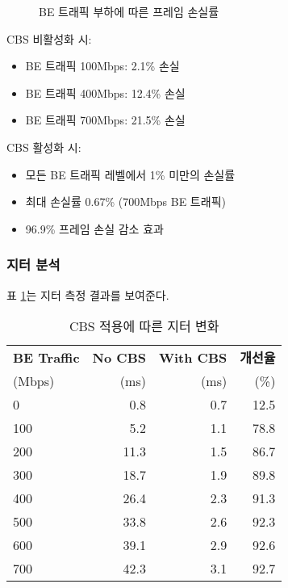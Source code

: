 \documentclass[twocolumn,10pt]{article}
\begin{document}
\begin{figure}[h]
\centering
{}
\caption{BE 트래픽 부하에 따른 프레임 손실률}
\label{fig:frame_loss}
\end{figure}

CBS 비활성화 시:
\begin{itemize}
    \item BE 트래픽 100Mbps: 2.1\% 손실
    \item BE 트래픽 400Mbps: 12.4\% 손실
    \item BE 트래픽 700Mbps: 21.5\% 손실
\end{itemize}

CBS 활성화 시:
\begin{itemize}
    \item 모든 BE 트래픽 레벨에서 1\% 미만의 손실률
    \item 최대 손실률 0.67\% (700Mbps BE 트래픽)
    \item 96.9\% 프레임 손실 감소 효과
\end{itemize}

\subsubsection{지터 분석}

표 \ref{tab:jitter_results}는 지터 측정 결과를 보여준다.

\begin{table}[h]
\centering
\caption{CBS 적용에 따른 지터 변화}
\label{tab:jitter_results}
\begin{tabular}{lrrr}
\toprule
\textbf{BE Traffic} & \textbf{No CBS} & \textbf{With CBS} & \textbf{개선율} \\
(Mbps) & (ms) & (ms) & (\%) \\
\midrule
0 & 0.8 & 0.7 & 12.5 \\
100 & 5.2 & 1.1 & 78.8 \\
200 & 11.3 & 1.5 & 86.7 \\
300 & 18.7 & 1.9 & 89.8 \\
400 & 26.4 & 2.3 & 91.3 \\
500 & 33.8 & 2.6 & 92.3 \\
600 & 39.1 & 2.9 & 92.6 \\
700 & 42.3 & 3.1 & 92.7 \\
\bottomrule
\end{tabular}
\end{table}
\end{document}
